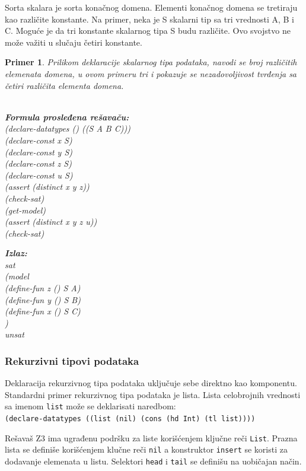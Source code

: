 \documentclass[12pt,oneside]{memoir}
\newcommand\tab[1][0.5cm]{\hspace*{#1}}
\newtheorem{primer}{Primer}
\begin{document}
Sorta skalara je sorta konačnog domena. Elementi konačnog domena se tretiraju kao različite konstante. Na primer, neka je S skalarni tip sa tri vrednosti A, B i C. Moguće je da tri konstante skalarnog tipa S budu različite. Ovo svojstvo ne može važiti u slučaju četiri konstante.

\begin{primer} Prilikom deklaracije skalarnog tipa podataka, navodi se broj različitih elemenata domena, u ovom primeru tri i pokazuje se nezadovoljivost tvrđenja sa četiri različita elementa domena. \\ \\
\begin{minipage}[b]{0.5\textwidth}
\textbf{Formula prosleđena rešavaču:}
\\(declare-datatypes () ((S A B C)))
\\(declare-const x S)
\\(declare-const y S)
\\(declare-const z S)
\\(declare-const u S)
\\(assert (distinct x y z))
\\(check-sat)
\\(get-model)
\\(assert (distinct x y z u))
\\(check-sat)
\end{minipage}
\hspace{2.5cm} 
\begin{minipage}[t]{0.5\textwidth}
\vspace{-6.58cm}
\textbf{Izlaz:}
\\sat 
\\(model 
\\\tab(define-fun z () S A) 
\\\tab(define-fun y () S B) 
\\\tab(define-fun x () S C)  
\\)
\\unsat
\end{minipage}
\end{primer}

\subsubsection{Rekurzivni tipovi podataka}

Deklaracija rekurzivnog tipa podataka uključuje sebe direktno kao komponentu. Standardni primer rekurzivnog tipa podataka je lista. 
Lista celobrojnih vrednosti sa imenom \texttt{list} može se deklarisati naredbom:\\
\texttt{(declare-datatypes ((list (nil) (cons (hd Int) (tl list))))}
\par
Rešavaš Z3 ima ugrađenu podršku za liste korišćenjem ključne reči \texttt{List}.
Prazna lista se definiše korišćenjem klučne reči \texttt{nil} a konstruktor \texttt{insert} se koristi za dodavanje elemenata u listu. Selektori \texttt{head} i \texttt{tail} se definišu na uobičajan način.
\end{document}
